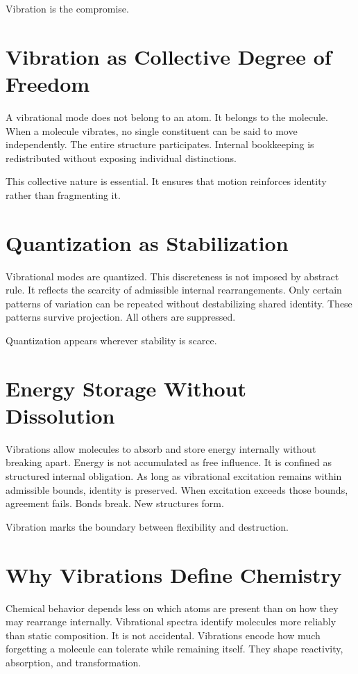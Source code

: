 \documentclass[11pt,twoside,openright]{book}
\begin{document}
Vibration is the compromise.

\section*{Vibration as Collective Degree of Freedom}

A vibrational mode does not belong to an atom. It belongs to the molecule. When a molecule vibrates, no single constituent can be said to move independently. The entire structure participates. Internal bookkeeping is redistributed without exposing individual distinctions.

This collective nature is essential. It ensures that motion reinforces identity rather than fragmenting it.

\section*{Quantization as Stabilization}

Vibrational modes are quantized. This discreteness is not imposed by abstract rule. It reflects the scarcity of admissible internal rearrangements. Only certain patterns of variation can be repeated without destabilizing shared identity. These patterns survive projection. All others are suppressed.

Quantization appears wherever stability is scarce.

\section*{Energy Storage Without Dissolution}

Vibrations allow molecules to absorb and store energy internally without breaking apart. Energy is not accumulated as free influence. It is confined as structured internal obligation. As long as vibrational excitation remains within admissible bounds, identity is preserved. When excitation exceeds those bounds, agreement fails. Bonds break. New structures form.

Vibration marks the boundary between flexibility and destruction.

\section*{Why Vibrations Define Chemistry}

Chemical behavior depends less on which atoms are present than on how they may rearrange internally. Vibrational spectra identify molecules more reliably than static composition. It is not accidental. Vibrations encode how much forgetting a molecule can tolerate while remaining itself. They shape reactivity, absorption, and transformation.
\end{document}
